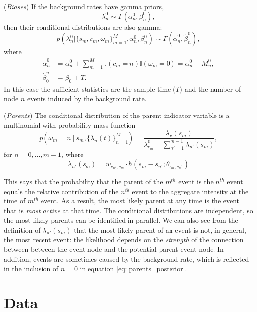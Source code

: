 (\textit{Biases}) If the background rates have gamma priors,
\begin{equation}
	\lambda_n^{0} \sim \Gamma(\alpha_n^0, \beta_n^0),
\end{equation}
then their conditional distributions are also gamma:
\begin{equation}
	p(\lambda_n^{0} | \{s_m, c_m, \omega_m\}_{m=1}^M, \alpha_n^0, \beta_n^0) \sim \Gamma(\tilde{\alpha}_n^0, \tilde{\beta}_n^0),
\end{equation}
where
\begin{align}
	\tilde{\alpha}_n^0 &= \alpha_n^0 + \sum_{m=1}^M \mathbb{I}(c_m=n) \mathbb{I}(\omega_m=0) = \alpha_n^0 + M_n^0, \\
	\tilde{\beta}_0^n &= \beta_0 + T.
\end{align}
In this case the sufficient statistics are the sample time ($T$) and the number of node $n$ events induced by the background rate.

(\textit{Parents}) The conditional distribution of the parent indicator variable is a multinomial with probability mass function
\begin{equation} \label{eq: parents_posterior}
	p(\omega_m = n \ | \ s_m, \{ \lambda_n(t)\}_{n=1}^M) = \frac{\lambda_n(s_m)}{\lambda_{c_m}^0 + \sum_{n'=1}^{m - 1} \lambda_{n'}(s_m)},
\end{equation}
for $n = 0, \dots, m - 1$, where
\begin{equation}
	\lambda_{n'}(s_m) = w_{c_{n'},c_m} \cdot \hbar(s_m - s_{n'}; \theta_{c_m,c_n'})
\end{equation}

This says that the probability that the parent of the $m^{th}$ event is the $n^{th}$ event equals the relative contribution of the $n^{th}$ event to the aggregate intensity at the time of $m^{th}$ event. As a result, the most likely parent at any time is the event that is \textit{most active} at that time. The conditional distributions are independent, so the most likely parents can be identified in parallel. We can also see from the definition of $\lambda_{n'}(s_m)$ that the most likely parent of an event is not, in general, the most recent event: the likelihood depends on the \textit{strength} of the connection between between the event node and the potential parent event node. In addition, events are sometimes caused by the background rate, which is reflected in the inclusion of $n=0$ in equation \eqref{eq: parents_posterior}.


\section{Data}

